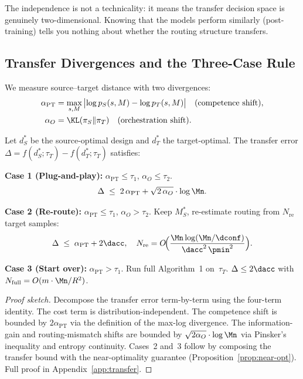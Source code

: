 The independence is not a technicality: it means the transfer decision
space is genuinely two-dimensional.  Knowing that the models perform
similarly (post-training) tells you nothing about whether the routing
structure transfers.

\subsection{Transfer Divergences and the Three-Case Rule}
\label{sec:transfer-rule}

We measure source--target distance with two divergences:
\begin{align}
  \alpha_{\mathrm{PT}} &= \max_{s,M}\,
    \bigl|\log p_S(s,M) - \log p_T(s,M)\bigr|
    \quad \text{(competence shift)},
    \label{eq:alpha-pt} \\
  \alpha_O &= \KL(\pi_S \| \pi_T)
    \quad \text{(orchestration shift)}.
    \label{eq:alpha-o}
\end{align}

\begin{theorem}
\label{thm:transfer}
Let $d_S^*$ be the source-optimal design and $d_T^*$ the target-optimal.
The transfer error
$\Delta = f(d_S^*;\tau_T) - f(d_T^*;\tau_T)$ satisfies:

\medskip
\noindent\textbf{Case 1 (Plug-and-play):}
$\alpha_{\mathrm{PT}} \le \tau_1$, $\alpha_O \le \tau_2$.
\begin{equation}
  \Delta \;\le\; 2\,\alpha_{\mathrm{PT}} + \sqrt{2\,\alpha_O}\cdot\log\Mn.
\end{equation}

\noindent\textbf{Case 2 (Re-route):}
$\alpha_{\mathrm{PT}} \le \tau_1$, $\alpha_O > \tau_2$.
Keep $M_S^*$, re-estimate routing from $N_{\mathrm{re}}$ target samples:
\begin{equation}
  \Delta \;\le\; \alpha_{\mathrm{PT}} + 2\dacc, \quad
  N_{\mathrm{re}} = O\!\Bigl(\frac{\Mn\log(\Mn/\dconf)}
    {\dacc^2\,\pmin^2}\Bigr).
\end{equation}

\noindent\textbf{Case 3 (Start over):}
$\alpha_{\mathrm{PT}} > \tau_1$.
Run full Algorithm~1 on~$\tau_T$.
$\Delta \le 2\dacc$ with $N_{\mathrm{full}} = O(m\cdot\Mn/R^2)$.
\end{theorem}

\begin{proof}[Proof sketch]
Decompose the transfer error term-by-term using the four-term identity.
The cost term is distribution-independent.  The competence shift is
bounded by $2\alpha_{\mathrm{PT}}$ via the definition of the max-log
divergence.  The information-gain and routing-mismatch shifts are bounded
by $\sqrt{2\alpha_O}\cdot\log\Mn$ via Pinsker's inequality and
entropy continuity.  Cases~2 and~3 follow by composing the transfer bound
with the near-optimality guarantee (Proposition~\ref{prop:near-opt}).
Full proof in Appendix~\ref{app:transfer}.
\end{proof}

